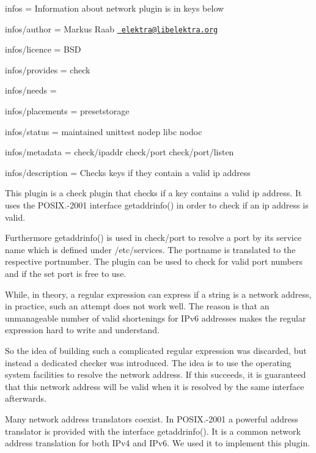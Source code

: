 
\begin{DoxyItemize}
\item infos = Information about network plugin is in keys below
\item infos/author = Markus Raab \href{mailto:elektra@libelektra.org}{\texttt{ elektra@libelektra.\+org}}
\item infos/licence = B\+SD
\item infos/provides = check
\item infos/needs =
\item infos/placements = presetstorage
\item infos/status = maintained unittest nodep libc nodoc
\item infos/metadata = check/ipaddr check/port check/port/listen
\item infos/description = Checks keys if they contain a valid ip address
\end{DoxyItemize}

This plugin is a check plugin that checks if a key contains a valid ip address. It uses the {\ttfamily P\+O\+S\+I\+X.-\/2001} interface {\ttfamily getaddrinfo()} in order to check if an ip address is valid.

Furthermore {\ttfamily getaddrinfo()} is used in {\ttfamily check/port} to resolve a port by its service name which is defined under {\ttfamily /etc/services}. The portname is translated to the respective portnumber. The plugin can be used to check for valid port numbers and if the set port is free to use.

While, in theory, a regular expression can express if a string is a network address, in practice, such an attempt does not work well. The reason is that an unmanageable number of valid shortenings for I\+Pv6 addresses makes the regular expression hard to write and understand.

So the idea of building such a complicated regular expression was discarded, but instead a dedicated checker was introduced. The idea is to use the operating system facilities to resolve the network address. If this succeeds, it is guaranteed that this network address will be valid when it is resolved by the same interface afterwards.

Many network address translators coexist. In {\ttfamily P\+O\+S\+I\+X.-\/2001} a powerful address translator is provided with the interface {\ttfamily getaddrinfo()}. It is a common network address translation for both I\+Pv4 and I\+Pv6. We used it to implement this plugin.

